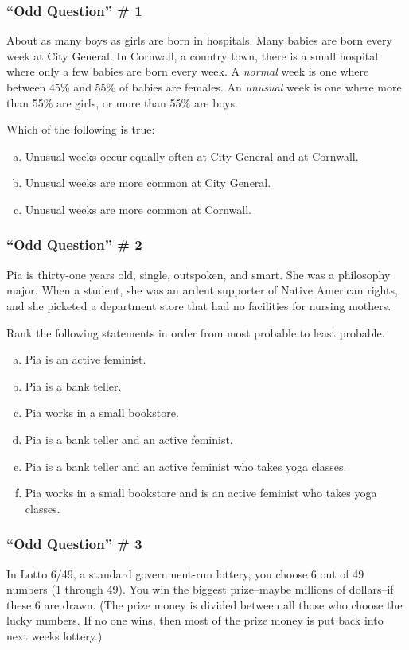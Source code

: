 \documentclass[handout]{beamer}
\begin{document}
\begin{singlespace}
\begin{frame}
\frametitle{``Odd Question'' \# 1}

About as many boys as girls are born in hospitals. Many babies are born every week at City General. In Cornwall, a country town, there is a small hospital where only a few babies are born every week. A \emph{normal} week is one where between 45\% and 55\% of babies are females. An \emph{unusual} week is one where more than 55\% are girls, or more than 55\% are boys. 

	\vspace{1em}
	Which of the following is true:
		\begin{enumerate}[(a)]
			\item Unusual weeks occur equally often at City General and at Cornwall.
			\item Unusual weeks are more common at City General.
			\item Unusual weeks are more common at Cornwall.
		\end{enumerate}
\end{frame}
\begin{frame}
\frametitle{``Odd Question'' \# 2}
Pia is thirty-one years old, single, outspoken, and smart. She was a philosophy major. When a student, she was an ardent supporter of Native American rights, and she picketed a department store that had no facilities for nursing mothers. 

\vspace{1em}
Rank the following statements in order from most probable to least probable.
		\begin{enumerate}[(a)]
			\item Pia is an active feminist.
			\item Pia is a bank teller.
			\item Pia works in a small bookstore.
			\item Pia is a bank teller and an active feminist.
			\item Pia is a bank teller and an active feminist who takes yoga classes.
			\item Pia works in a small bookstore and is an active feminist who takes yoga classes.
		\end{enumerate}
\end{frame}
\begin{frame}
\frametitle{``Odd Question'' \# 3}
In Lotto 6/49, a standard government-run lottery, you choose 6 out of 49 numbers (1 through 49). You win the biggest prize--maybe millions of dollars--if these 6 are drawn. (The prize money is divided between all those who choose the lucky numbers. If no one wins, then most of the prize money is put back into next weeks lottery.)
	

\end{frame}
\end{singlespace}
\end{document}
